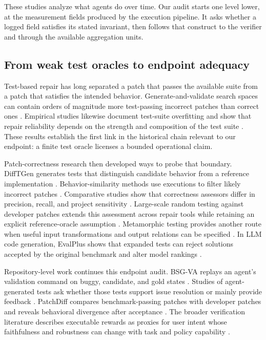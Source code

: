 These studies analyze what agents do over time. Our audit starts one level lower, at the measurement fields produced by the execution pipeline. It asks whether a logged field satisfies its stated invariant, then follows that construct to the verifier and through the available aggregation units.

\subsection{From weak test oracles to endpoint adequacy}

Test-based repair has long separated a patch that passes the available suite from a patch that satisfies the intended behavior. Generate-and-validate search spaces can contain orders of magnitude more test-passing incorrect patches than correct ones \citep{long2016searchspaces}. Empirical studies likewise document test-suite overfitting and show that repair reliability depends on the strength and composition of the test suite \citep{qi2015plausibility,smith2015overfitting,yi2018testsuite}. These results establish the first link in the historical chain relevant to our endpoint: a finite test oracle licenses a bounded operational claim.

Patch-correctness research then developed ways to probe that boundary. DiffTGen generates tests that distinguish candidate behavior from a reference implementation \citep{xin2017difftgen}. Behavior-similarity methods use executions to filter likely incorrect patches \citep{xiong2018patchcorrectness}. Comparative studies show that correctness assessors differ in precision, recall, and project sensitivity \citep{wang2020apca,le2019reliability}. Large-scale random testing against developer patches extends this assessment across repair tools while retaining an explicit reference-oracle assumption \citep{ye2021patchassessment}. Metamorphic testing provides another route when useful input transformations and output relations can be specified \citep{segura2016metamorphic}. In LLM code generation, EvalPlus shows that expanded tests can reject solutions accepted by the original benchmark and alter model rankings \citep{liu2023evalplus}.

Repository-level work continues this endpoint audit. BSG-VA replays an agent's validation command on buggy, candidate, and gold states \citep{xu2026validation}. Studies of agent-generated tests ask whether those tests support issue resolution or mainly provide feedback \citep{chen2026agenttests}. PatchDiff compares benchmark-passing patches with developer patches and reveals behavioral divergence after acceptance \citep{wang2025patchdiff}. The broader verification literature describes executable rewards as proxies for user intent whose faithfulness and robustness can change with task and policy capability \citep{wang2026verification}.


